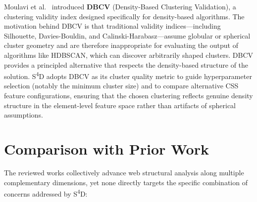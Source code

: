 Moulavi et al.~\cite{moulavi2014dbcv} introduced \textbf{DBCV} (Density-Based Clustering Validation), a clustering validity index designed specifically for density-based algorithms. The motivation behind DBCV is that traditional validity indices---including Silhouette, Davies-Bouldin, and Calinski-Harabasz---assume globular or spherical cluster geometry and are therefore inappropriate for evaluating the output of algorithms like HDBSCAN, which can discover arbitrarily shaped clusters. DBCV provides a principled alternative that respects the density-based structure of the solution. S\textsuperscript{4}D adopts DBCV as its cluster quality metric to guide hyperparameter selection (notably the minimum cluster size) and to compare alternative CSS feature configurations, ensuring that the chosen clustering reflects genuine density structure in the element-level feature space rather than artifacts of spherical assumptions.

\section{Comparison with Prior Work}
\label{sec:comparison}

The reviewed works collectively advance web structural analysis along multiple complementary dimensions, yet none directly targets the specific combination of concerns addressed by S\textsuperscript{4}D:

